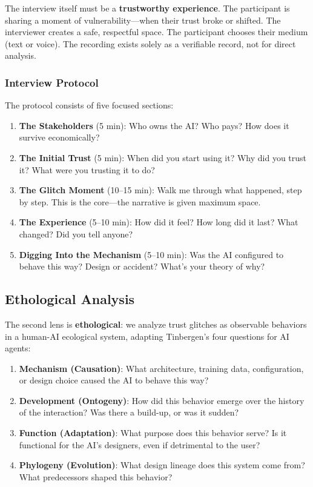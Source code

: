 \documentclass[11pt,a4paper]{article}
\begin{document}
The interview itself must be a \textbf{trustworthy experience}. The participant is sharing a moment of vulnerability---when their trust broke or shifted. The interviewer creates a safe, respectful space. The participant chooses their medium (text or voice). The recording exists solely as a verifiable record, not for direct analysis.

\subsubsection{Interview Protocol}

The protocol consists of five focused sections:

\begin{enumerate}
    \item \textbf{The Stakeholders} (5 min): Who owns the AI? Who pays? How does it survive economically?
    \item \textbf{The Initial Trust} (5 min): When did you start using it? Why did you trust it? What were you trusting it to do?
    \item \textbf{The Glitch Moment} (10--15 min): Walk me through what happened, step by step. This is the core---the narrative is given maximum space.
    \item \textbf{The Experience} (5--10 min): How did it feel? How long did it last? What changed? Did you tell anyone?
    \item \textbf{Digging Into the Mechanism} (5--10 min): Was the AI configured to behave this way? Design or accident? What's your theory of why?
\end{enumerate}

\subsection{Ethological Analysis}

The second lens is \textbf{ethological}: we analyze trust glitches as observable behaviors in a human-AI ecological system, adapting Tinbergen's four questions \citep{tinbergen1963aims} for AI agents:

\begin{enumerate}[noitemsep]
    \item \textbf{Mechanism (Causation)}: What architecture, training data, configuration, or design choice caused the AI to behave this way?
    \item \textbf{Development (Ontogeny)}: How did this behavior emerge over the history of the interaction? Was there a build-up, or was it sudden?
    \item \textbf{Function (Adaptation)}: What purpose does this behavior serve? Is it functional for the AI's designers, even if detrimental to the user?
    \item \textbf{Phylogeny (Evolution)}: What design lineage does this system come from? What predecessors shaped this behavior?
\end{enumerate}
\end{document}

